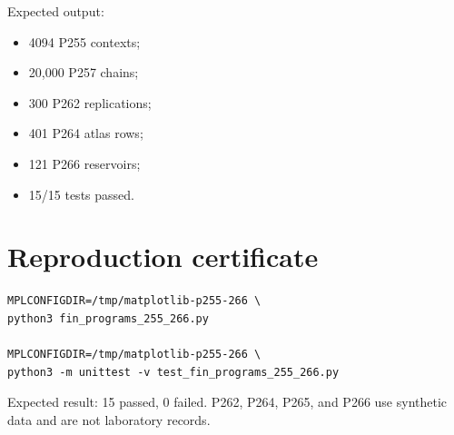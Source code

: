 \documentclass[11pt,a4paper,openany]{report}
\begin{document}
Expected output:

\begin{itemize}
\item 
4094 P255 contexts;

\item 
20,000 P257 chains;

\item 
300 P262 replications;

\item 
401 P264 atlas rows;

\item 
121 P266 reservoirs;

\item 
15/\allowbreak{}15 tests passed.

\end{itemize}


\clearpage
\chapter*{Reproduction certificate}
\begin{Verbatim}[fontsize=\small]
MPLCONFIGDIR=/tmp/matplotlib-p255-266 \
python3 fin_programs_255_266.py

MPLCONFIGDIR=/tmp/matplotlib-p255-266 \
python3 -m unittest -v test_fin_programs_255_266.py
\end{Verbatim}
Expected result: 15 passed, 0 failed. P262, P264, P265, and P266 use synthetic
data and are not laboratory records.
\end{document}
